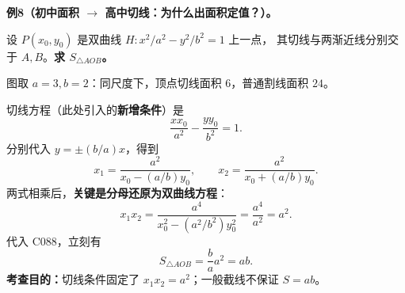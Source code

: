 \clearpage
\begin{examplebox}
\textbf{例8（初中面积 $\to$ 高中切线：为什么出面积定值？）。}

设 $P(x_0,y_0)$ 是双曲线 $H:x^2/a^2-y^2/b^2=1$ 上一点，
其切线与两渐近线分别交于 $A,B$。\textbf{求 $S_{\triangle AOB}$。}

\begin{center}\end{center}
图取 $a=3,b=2$：同尺度下，顶点切线面积 $6$，普通割线面积 $24$。

切线方程（此处引入的\textbf{新增条件}）是
\[
\frac{xx_0}{a^2}-\frac{yy_0}{b^2}=1.
\]
分别代入 $y=\pm(b/a)x$，得到
\[
x_1=\frac{a^2}{x_0-(a/b)y_0},\qquad
x_2=\frac{a^2}{x_0+(a/b)y_0}.
\]
两式相乘后，\textbf{关键是分母还原为双曲线方程}：
\[
 x_1x_2=\frac{a^4}{x_0^2-(a^2/b^2)y_0^2}
 =\frac{a^4}{a^2}=\boxed{a^2}.
\]
代入 C088，立刻有
\[
\boxed{S_{\triangle AOB}=\frac ba a^2=ab}.
\]
\textbf{考查目的：}切线条件固定了 $x_1x_2=a^2$；一般截线不保证 $S=ab$。
\end{examplebox}
